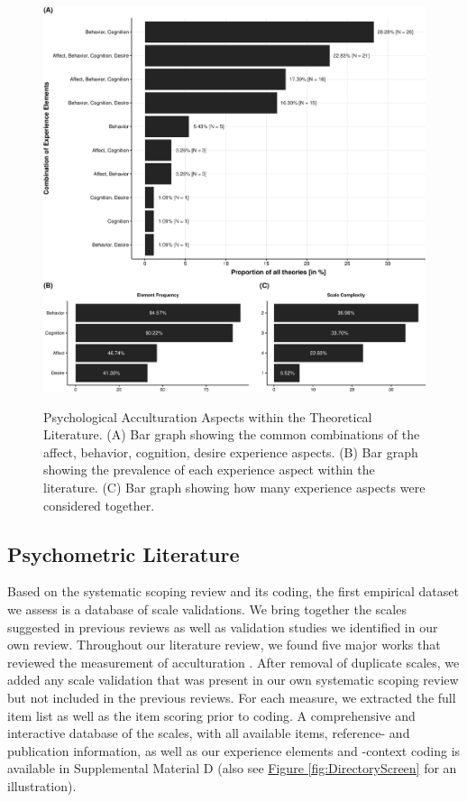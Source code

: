 \documentclass[man, 12pt, a4paper, mask]{apa7}
\newcommand{\fgrref}[2][]{\hyperref[#2]{Figure \ref*{#2}#1}}
\begin{document}
\begin{figure}[h]
\centering
\caption{Psychological Acculturation Aspects within the Theoretical Literature. (A) Bar graph showing the common combinations of the affect, behavior, cognition, desire experience aspects. (B) Bar graph showing the prevalence of each experience aspect within the literature. (C) Bar graph showing how many experience aspects were considered together.}
\includegraphics[width=\textwidth]{Figures/TheoriesFreq-1}
\label{fig:ElementsTheories}
\end{figure}



\subsection{Psychometric Literature}

Based on the systematic scoping review and its coding, the first
empirical dataset we assess is a database of scale validations. We bring
together the scales suggested in previous reviews as well as validation
studies we identified in our own review. Throughout our literature
review, we found five major works that reviewed the measurement of
acculturation
\citep{Celenk2011, Maestas2000, Matsudaira2006, Wallace2010, Zane2004}.
After removal of duplicate scales, we added any scale validation that
was present in our own systematic scoping review but not included in the
previous reviews. For each measure, we extracted the full item list as
well as the item scoring prior to coding. A comprehensive and
interactive database of the scales, with all available items, reference-
and publication information, as well as our experience elements and
-context coding is available in Supplemental Material D (also see
\fgrref{fig:DirectoryScreen} for an illustration).
\end{document}
